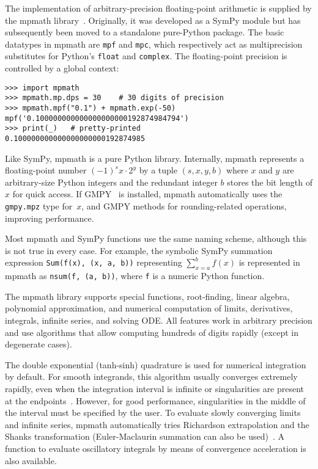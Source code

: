 The implementation of arbitrary-precision floating-point arithmetic is
supplied by the mpmath library~\cite{mpmath}. Originally, it was developed as a SymPy
module but has subsequently been moved to a standalone pure-Python package.
The basic datatypes in mpmath are \texttt{mpf} and \texttt{mpc}, which
respectively act as multiprecision substitutes for Python's \texttt{float} and
\texttt{complex}. The floating-point precision is controlled by a global
context:

\begin{verbatim}
>>> import mpmath
>>> mpmath.mp.dps = 30    # 30 digits of precision
>>> mpmath.mpf("0.1") + mpmath.exp(-50)
mpf('0.100000000000000000000192874984794')
>>> print(_)   # pretty-printed
0.100000000000000000000192874985
\end{verbatim}

Like SymPy, mpmath is a pure Python library.
Internally, mpmath represents a floating-point number
${(-1)}^s x \cdot 2^y$ by a tuple $(s, x, y, b)$ where
$x$ and $y$ are arbitrary-size Python integers
and the redundant integer $b$ stores the bit length of $x$ for quick access.
If GMPY~\cite{GMPY} is installed, mpmath automatically uses
the \texttt{gmpy.mpz} type for~$x$, and GMPY methods
for rounding-related operations, improving performance.

Most mpmath and SymPy functions use the same naming scheme, although this is
not true in every case. For example, the symbolic SymPy summation expression
\texttt{Sum(f(x), (x, a, b))} representing $\sum_{x=a}^b f(x)$ is represented
in mpmath as \texttt{nsum(f, (a, b))}, where \texttt{f} is a numeric Python
function.

The mpmath library supports
special functions, root-finding, linear algebra, polynomial approximation,
and numerical computation of limits, derivatives, integrals, infinite
series, and solving ODE. All features work in arbitrary precision
and use algorithms that allow computing hundreds of digits rapidly
(except in degenerate cases).

The double exponential (tanh-sinh) quadrature is used for numerical
integration by default. For smooth integrands, this algorithm usually
converges extremely rapidly, even when the integration interval is infinite
or singularities are present at the endpoints~\cite{takahasi1974double,bailey2005comparison}.
However, for good performance, singularities
in the middle of the interval must be specified
by the user.
To evaluate slowly converging limits and infinite series, mpmath
automatically tries Richardson extrapolation and the
Shanks transformation
(Euler-Maclaurin summation can also be used)~\cite{BenderOrszag1999}.
A function to evaluate oscillatory integrals by means of convergence
acceleration is also available.

